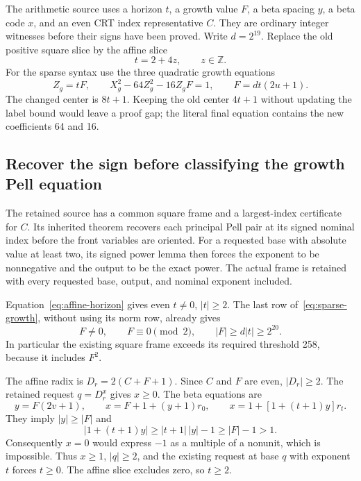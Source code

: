 \documentclass[11pt,letterpaper]{article}
\theoremstyle{remark}\newtheorem{remark}[theorem]{Remark}
\newcommand{\Z}{\mathbb Z}\newcommand{\N}{\mathbb N}
\begin{document}
The arithmetic source uses a horizon $t$, a growth value $F$, a beta
spacing $y$, a beta code $x$, and an even CRT index representative $C$.
They are ordinary integer witnesses before their signs have been proved.
Write $d=2^{19}$. Replace the old positive square slice by the affine
slice
\begin{equation}\label{eq:affine-horizon}
 t=2+4z,\qquad z\in\Z.
\end{equation}
For the sparse syntax use the three quadratic growth equations
\begin{equation}\label{eq:sparse-growth}
 Z_g=tF,\qquad X_g^2-64Z_g^2-16Z_gF=1,
 \qquad F=dt(2u+1).
\end{equation}
The changed center is $8t+1$. Keeping the old center $4t+1$ without
updating the label bound would leave a proof gap; the literal final
equation contains the new coefficients 64 and 16.

\subsection{Recover the sign before classifying the growth Pell equation}

The retained source has a common square frame and a largest-index
certificate for $C$. Its inherited theorem recovers each principal Pell
pair at its signed nominal index before the front variables are oriented.
For a requested base with absolute value at least two, its signed power
lemma then forces the exponent to be nonnegative and the output to be
the exact power. The actual frame is retained with every requested base,
output, and nominal exponent included.

Equation~\eqref{eq:affine-horizon} gives even $t\ne0$, $|t|\ge2$.
The last row of~\eqref{eq:sparse-growth}, without using its norm row,
already gives
\[
 F\ne0,\qquad F\equiv0\pmod2,\qquad |F|\ge d|t|\ge2^{20}.
\]
In particular the existing square frame exceeds its required threshold
258, because it includes $F^2$.

The affine radix is $D_r=2(C+F+1)$. Since $C$ and $F$ are even,
$|D_r|\ge2$. The retained request $q=D_r^x$ gives $x\ge0$.
The beta equations are
\begin{equation}\label{eq:beta-endpoints}
 y=F(2v+1),\qquad
 x=F+1+(y+1)r_0,\qquad
 x=1+[1+(t+1)y]r_t.
\end{equation}
They imply $|y|\ge|F|$ and
\[
 |1+(t+1)y|\ge|t+1|\,|y|-1\ge|F|-1>1.
\]
Consequently $x=0$ would express $-1$ as a multiple of a nonunit,
which is impossible. Thus $x\ge1$, $|q|\ge2$, and the existing request
at base $q$ with exponent $t$ forces $t\ge0$. The affine slice excludes
zero, so $t\ge2$.
\end{document}
